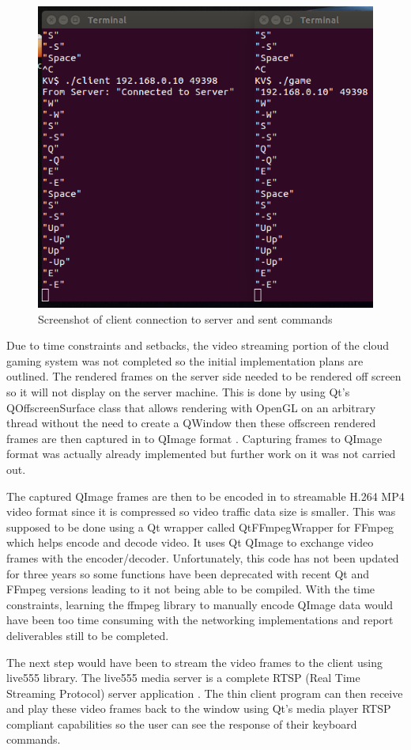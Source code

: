 \begin{figure}[h!]
 \centering
 \includegraphics[width=0.7\linewidth]{images/gamecommands.png}
 \caption{Screenshot of client connection to server and sent commands}
 \label{fig:gamecommands}
\end{figure}

Due to time constraints and setbacks, the video streaming portion of the cloud gaming system was not completed so the initial implementation plans are outlined. The rendered frames on the server side needed to be rendered off screen so it will not display on the server machine. This is done by using Qt's QOffscreenSurface class that allows rendering with OpenGL on an arbitrary thread without the need to create a QWindow then these offscreen rendered frames are then captured in to QImage format \cite{qoffscreen}. Capturing frames to QImage format was actually already implemented but further work on it was not carried out.
\newline
\par
The captured QImage frames are then to be encoded in to streamable H.264 MP4 video format since it is compressed so video traffic data size is smaller. This was supposed to be done using a Qt wrapper called QtFFmpegWrapper\cite{qtffmpeg} for FFmpeg which helps encode and decode video. It uses Qt QImage to exchange video frames with the encoder/decoder. Unfortunately, this code has not been updated for three years so some functions have been deprecated with recent Qt and FFmpeg versions leading to it not being able to be compiled. With the time constraints, learning the ffmpeg library to manually encode QImage data would have been too time consuming with the networking implementations and report deliverables still to be completed.
\newline
\par
The next step would have been to stream the video frames to the client using live555 library. The live555 media server is a complete RTSP (Real Time Streaming Protocol) server application \cite{live555}. The thin client program can then receive and play these video frames back to the window using Qt's media player RTSP compliant capabilities so the user can see the response of their keyboard commands.
 
